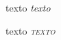 \documentclass[a4paper,12pt]{article}
\begin{document}
	texto \textsl{\textsf{texto}}
	
	texto \textsl{\textsc{texto}}
	
	
\end{document}

